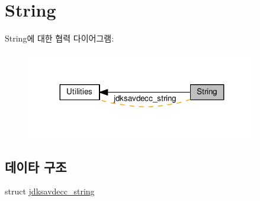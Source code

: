 \hypertarget{group__string}{}\section{String}
\label{group__string}
String에 대한 협력 다이어그램\+:
\nopagebreak
\begin{figure}[H]
\begin{center}
\leavevmode
\includegraphics[width=287pt]{group__string}
\end{center}
\end{figure}
\subsection*{데이타 구조}
\begin{DoxyCompactItemize}
\item 
struct \hyperlink{structjdksavdecc__string}{jdksavdecc\+\_\+string}
\end{DoxyCompactItemize}
